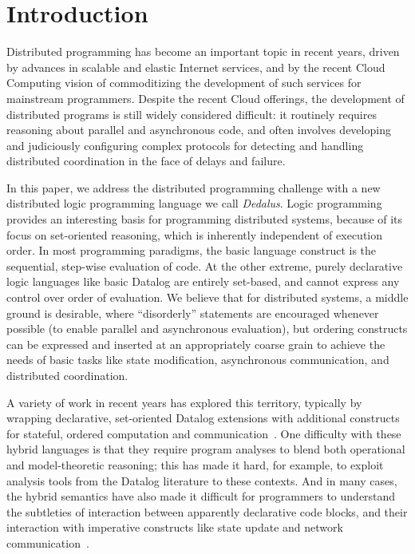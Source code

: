 \section{Introduction}
Distributed programming has become an important topic in recent years, driven by advances in scalable and elastic Internet services, and by the recent Cloud Computing vision of commoditizing the development of such services for mainstream programmers.  Despite the recent Cloud offerings, the development of distributed programs is still widely considered difficult: it routinely requires reasoning about parallel and asynchronous code, and often involves developing and judiciously configuring complex protocols for detecting and handling distributed coordination in the face of delays and failure.

In this paper, we address the distributed programming challenge with a new distributed logic programming language we call {\em Dedalus}.
Logic programming provides an interesting basis for programming distributed systems, because of its focus on set-oriented reasoning, which is inherently independent of execution order.  In most programming paradigms, the basic language construct is the sequential, step-wise evaluation of code. At the other extreme, purely declarative logic languages like basic Datalog are entirely set-based, and cannot express any control over order of evaluation.  We believe that for distributed systems, a middle ground is desirable, where ``disorderly'' statements are encouraged whenever possible (to enable parallel and asynchronous evaluation), but ordering constructs can be expressed and inserted at an appropriately coarse grain to achieve the needs of basic tasks like state modification, asynchronous communication, and distributed coordination.

A variety of work in recent years has explored this territory, typically by wrapping declarative, set-oriented Datalog extensions with additional constructs for stateful, ordered computation and communication~\cite{overlog,reactors,meld,prolog-events-gui,etc}.  One difficulty with these hybrid languages is that they require program analyses to blend both operational and model-theoretic reasoning; this has made it hard, for example, to exploit analysis tools from the Datalog literature to these contexts.  And in many cases, the hybrid semantics have also made it difficult for programmers to understand the subtleties of interaction between apparently declarative code blocks, and their interaction with imperative constructs like state update and network communication~\cite{overlogkvetches}.


